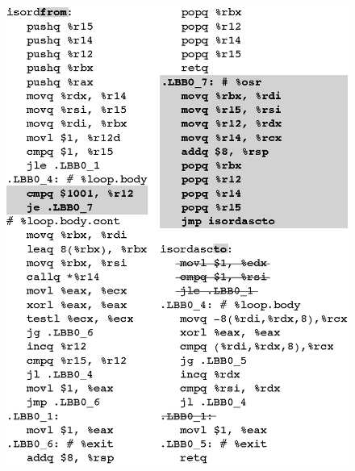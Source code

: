 \ifdefined\noauthorea
\begin{figure}[t]
\begin{center}
\includegraphics[width=0.9\columnwidth]{figures/isordx86-64/isordx86-64.eps}
\caption{\protect}
\end{center}
\end{figure}
\fi


  

  
  
  
  